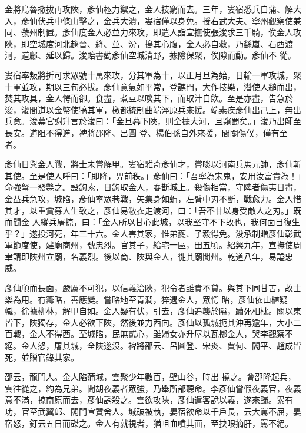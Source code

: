 \begin{pinyinscope}
 金將烏魯撒拔再攻陜，彥仙極力禦之，金人技窮而去。三年，婁宿悉兵自蒲、解大入，彥仙伏兵中條山擊之，金兵大潰，婁宿僅以身免。授右武大夫、寧州觀察使兼同、虢州制置。彥仙度金人必並力來攻，即遣人詣宣撫使張浚求三千騎，俟金人攻陜，即空城度河北趨晉、絳、並、汾，搗其心腹，金人必自救，乃繇嵐、石西渡河，道鄜、延以歸。浚貽書勸彥仙空城清野，據險保聚，俟隙而動。彥仙不
 從。



 婁宿率叛將折可求眾號十萬來攻，分其軍為十，以正月旦為始，日輪一軍攻城，聚十軍並攻，期以三旬必拔。彥仙意氣如平常，登譙門，大作技樂，潛使人縋而出，焚其攻具，金人愕而卻。食盡，煮豆以啖其下，而取汁自飲。至是亦盡，告急於浚，浚間道以金幣使犒其軍，檄都統制曲端涇原兵來援。端素疾彥仙出己上，無出兵意。浚幕官謝升言於浚曰：「金旦暮下陜，則全據大河，且窺蜀矣。」浚乃出師至長安。道阻不得進，裨將邵隆、呂圓
 登、楊伯孫自外來援，間關傷僕，僅有至者。



 彥仙日與金人戰，將士未嘗解甲。婁宿雅奇彥仙才，嘗啖以河南兵馬元帥，彥仙斬其使。至是使人呼曰：「即降，畀前秩。」彥仙曰：「吾寧為宋鬼，安用汝富貴為！」命強弩一發斃之。設鉤索，日鉤取金人，舂斮城上。殺傷相當，守陴者傷夷日盡，金益兵急攻，城陷，彥仙率眾巷戰，矢集身如蝟，左臂中刃不斷，戰愈力。金人惜其才，以重賞募人生致之，彥仙易敝衣走渡河，曰：「吾不甘以身受敵人之刃。」既而聞金
 人縱兵屠掠，曰：「金人所以甘心此城，以我堅守不下故也，我何面目復生乎？」遂投河死，年三十六。金人害其家，惟弟夔、子毅得免。浚承制贈彥仙彰武軍節度使，建廟商州，號忠烈。官其子，給宅一區，田五頃。紹興九年，宣撫使周聿請即陜州立廟，名義烈。後以商、陜與金人，徙其廟閬州。乾道八年，易謚忠威。



 彥仙頎而長面，嚴厲不可犯，以信義治陜，犯令者雖貴不貸。與其下同甘苦，故士樂為用。有籌略，善應變。嘗略地至青澗，猝遇金人，眾愕
 眙，彥仙依山植疑幟，徐據柳林，解甲自如。金人疑有伏，引去，彥仙追襲於隘，躪死相枕。關以東皆下，陜獨存，金人必欲下陜，然後並力西向。彥仙以孤城扼其沖再逾年，大小二百戰，金人不得西。至城陷，民無貳心，雖婦女亦升屋以瓦擲金人，哭李觀察不絕。金人怒，屠其城，全陜遂沒。裨將邵云、呂圓登、宋炎、賈何、閻平、趙成皆死，並贈官錄其家。



 邵云，龍門人。金人陷蒲城，雲聚少年數百，壁山谷，時出
 撓之。會邵隆起兵，雲往從之，約為兄弟。聞胡夜義者眾強，乃舉所部聽命。李彥仙嘗假夜義官，夜義意不滿，掠南原而去，彥仙誘殺之。雲欲攻陜，彥仙遣客說以義，遂來歸。累有功，官至武翼郎、閣門宣贊舍人。城破被執，婁宿欲命以千戶長，云大罵不屈，婁宿怒，釘云五日而磔之。金人有就視者，猶咀血噴其面，至抉眼摘肝，罵不絕。




\end{pinyinscope}
